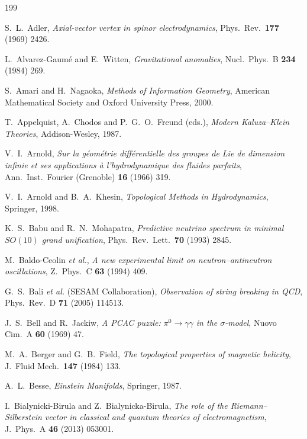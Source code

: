 \begin{thebibliography}{199}
\small
\setlength{\itemsep}{1pt}

 S.~L.~Adler, \emph{Axial-vector vertex in spinor electrodynamics}, Phys.~Rev.~\textbf{177} (1969) 2426.

 L.~Alvarez-Gaum\'e and E.~Witten, \emph{Gravitational anomalies}, Nucl.~Phys.~B \textbf{234} (1984) 269.

 S.~Amari and H.~Nagaoka, \emph{Methods of Information Geometry}, American Mathematical Society and Oxford University Press, 2000.

 T.~Appelquist, A.~Chodos and P.~G.~O.~Freund (eds.), \emph{Modern Kaluza--Klein Theories}, Addison-Wesley, 1987.

 V.~I.~Arnold, \emph{Sur la g\'eom\'etrie diff\'erentielle des groupes de Lie de dimension infinie et ses applications \`a l'hydrodynamique des fluides
parfaits}, Ann.~Inst.~Fourier (Grenoble) \textbf{16} (1966) 319.

 V.~I.~Arnold and B.~A.~Khesin, \emph{Topological Methods in Hydrodynamics}, Springer, 1998.

 K.~S.~Babu and R.~N.~Mohapatra, \emph{Predictive neutrino spectrum in minimal $SO(10)$ grand unification}, Phys.~Rev.~Lett.~\textbf{70} (1993) 2845.

 M.~Baldo-Ceolin \emph{et al.}, \emph{A new experimental limit on neutron--antineutron oscillations}, Z.~Phys.~C \textbf{63} (1994) 409.

 G.~S.~Bali \emph{et al.} (SESAM Collaboration), \emph{Observation of string breaking in QCD}, Phys.~Rev.~D \textbf{71} (2005) 114513.

 J.~S.~Bell and R.~Jackiw, \emph{A PCAC puzzle: $\pi^0\to\gamma\gamma$ in the $\sigma$-model}, Nuovo Cim.~A \textbf{60} (1969) 47.

 M.~A.~Berger and G.~B.~Field, \emph{The topological properties of magnetic helicity}, J.~Fluid Mech.~\textbf{147} (1984) 133.

 A.~L.~Besse, \emph{Einstein Manifolds}, Springer, 1987.

 I.~Bialynicki-Birula and Z.~Bialynicka-Birula, \emph{The role of the Riemann--Silberstein vector in classical and quantum theories of
electromagnetism}, J.~Phys.~A \textbf{46} (2013) 053001.


\end{thebibliography}
